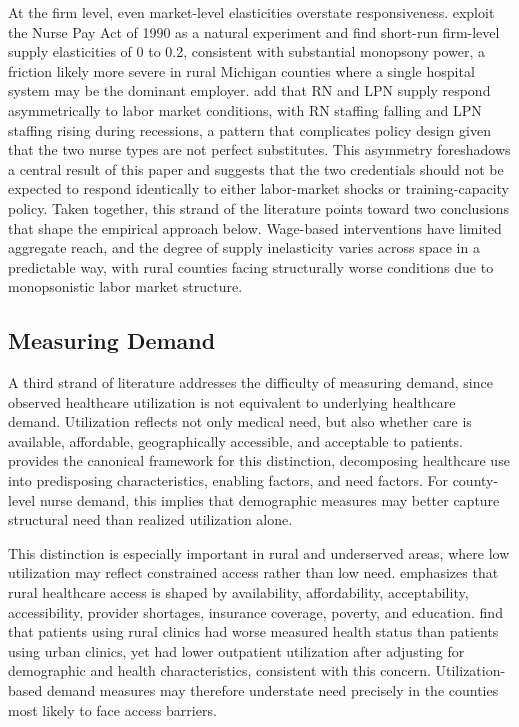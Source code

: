 \documentclass[12pt]{article}
\begin{document}
At the firm level, even market-level elasticities overstate responsiveness. \citet{staiger2010} exploit the Nurse Pay Act of 1990 as a natural experiment and find short-run firm-level supply elasticities of 0 to 0.2, consistent with substantial monopsony power, a friction likely more severe in rural Michigan counties where a single hospital system may be the dominant employer. \citet{konetzka2018} add that RN and LPN supply respond asymmetrically to labor market conditions, with RN staffing falling and LPN staffing rising during recessions, a pattern that complicates policy design given that the two nurse types are not perfect substitutes. This asymmetry foreshadows a central result of this paper and suggests that the two credentials should not be expected to respond identically to either labor-market shocks or training-capacity policy. Taken together, this strand of the literature points toward two conclusions that shape the empirical approach below. Wage-based interventions have limited aggregate reach, and the degree of supply inelasticity varies across space in a predictable way, with rural counties facing structurally worse conditions due to monopsonistic labor market structure.

\subsection{Measuring Demand}

A third strand of literature addresses the difficulty of measuring demand, since observed healthcare utilization is not equivalent to underlying healthcare demand. Utilization reflects not only medical need, but also whether care is available, affordable, geographically accessible, and acceptable to patients. \citet{andersen1995} provides the canonical framework for this distinction, decomposing healthcare use into predisposing characteristics, enabling factors, and need factors. For county-level nurse demand, this implies that demographic measures may better capture structural need than realized utilization alone.

This distinction is especially important in rural and underserved areas, where low utilization may reflect constrained access rather than low need. \citet{reilly2021} emphasizes that rural healthcare access is shaped by availability, affordability, acceptability, accessibility, provider shortages, insurance coverage, poverty, and education. \citet{nuako2022} find that patients using rural clinics had worse measured health status than patients using urban clinics, yet had lower outpatient utilization after adjusting for demographic and health characteristics, consistent with this concern. Utilization-based demand measures may therefore understate need precisely in the counties most likely to face access barriers.
\end{document}
